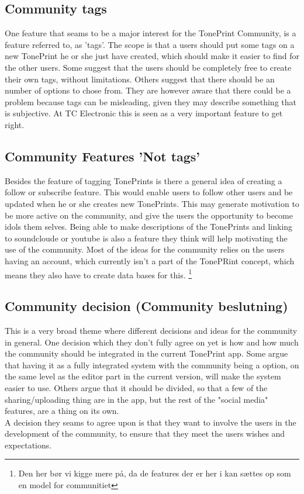 \subsection*{Community tags} 
\label{ThemeCommunityTags}
One feature that seams to be a major interest for the TonePrint Community, is a feature referred to, as 'tags'. The scope is that a users should put some tags on a new TonePrint he or she just have created, which should make it easier to find for the other users. Some suggest that the users should be completely free to create their own tags, without limitations. Others suggest that there should be an number of options to chose from. They are however aware that there could be a problem because tags can be misleading, given they may describe something that is subjective. At TC Electronic this is seen as a very important feature to get right.

\subsection{Community Features 'Not tags'}
\label{ThemeCommuninityFeaturesNotTags}
Besides the feature of tagging TonePrints is there a general idea of creating a follow or subscribe feature. This would enable users to follow other users and be updated when he or she creates new TonePrints. This may generate motivation to be more active on the community, and give the users the opportunity to become idols them selves. Being able to make descriptions of the TonePrints and linking to soundcloude or youtube is also a feature they think will help motivating the use of the community. Most of the ideas for the community relies on the users having an account, which currently isn't a part of the TonePRint concept, which means they also have to create data bases for this. \footnote{Den her bør vi kigge mere på, da de features der er her i kan sættes op som en model for communitiet}

\subsection*{Community decision (Community beslutning)} 
\label{ThemeCommunityDecision}
This is a very broad theme where different decisions and ideas for the community in general. One decision which they don't fully agree on yet is how and how much the community should be integrated in the current TonePrint app. Some argue that having it as a fully integrated system with the community being a option, on the same level as the editor part in the current version, will make the system easier to use. Others argue that it should be divided, so that a few of the sharing/uploading thing are in the app, but the rest of the "social media" features, are a thing on its own. \\
A decision they seams to agree upon is that they want to involve the users in the development of the community, to ensure that they meet the users wishes and expectations. 

